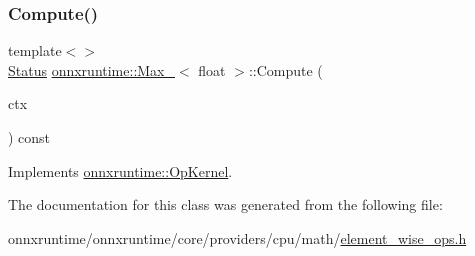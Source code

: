 \subsubsection{\texorpdfstring{Compute()}{Compute()}\hspace{0.1cm}{\footnotesize\ttfamily [2/2]}}
{\footnotesize\ttfamily template$<$$>$ \\
\mbox{\hyperlink{classonnxruntime_1_1common_1_1Status}{Status}} \mbox{\hyperlink{classonnxruntime_1_1Max__6}{onnxruntime\+::\+Max\+\_}}$<$ float $>$\+::Compute (\begin{DoxyParamCaption}\item[{\mbox{\hyperlink{classonnxruntime_1_1OpKernelContext}{Op\+Kernel\+Context}} $\ast$}]{ctx }\end{DoxyParamCaption}) const\hspace{0.3cm}{\ttfamily [virtual]}}



Implements \mbox{\hyperlink{classonnxruntime_1_1OpKernel_a9eca8656a78b1b3ab9d3351a12798650}{onnxruntime\+::\+Op\+Kernel}}.



The documentation for this class was generated from the following file\+:\begin{DoxyCompactItemize}
\item 
onnxruntime/onnxruntime/core/providers/cpu/math/\mbox{\hyperlink{element__wise__ops_8h}{element\+\_\+wise\+\_\+ops.\+h}}\end{DoxyCompactItemize}
